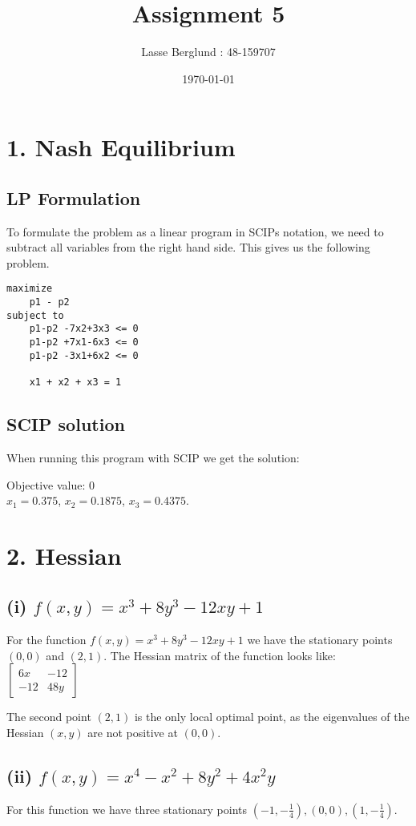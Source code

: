 \documentclass[12pt]{report}
\title{Assignment 5}
\author{Lasse Berglund : 48-159707}
\date{\today}
\begin{document}
\maketitle

\section*{1. Nash Equilibrium}
\subsection*{LP Formulation}
	To formulate the problem as a linear program in SCIPs notation, we need to subtract all variables from the right hand side. This gives us the following problem.

	\begin{verbatim}
maximize 
	p1 - p2
subject to
	p1-p2 -7x2+3x3 <= 0
	p1-p2 +7x1-6x3 <= 0
	p1-p2 -3x1+6x2 <= 0

	x1 + x2 + x3 = 1

	\end{verbatim}

\subsection*{SCIP solution}
	When running this program with SCIP we get the solution:

	Objective value: $0$\\
	$x_1 = 0.375$, $x_2 = 0.1875$, $x_3 = 0.4375$.

\section*{2. Hessian}
\subsection*{(i) $f(x,y)= x^3 + 8y^3 -12xy +1$}
For the function $f(x,y)= x^3 + 8y^3 -12xy +1$ we have the stationary points $(0,0)$ and $(2,1)$. The Hessian matrix of the function looks like:
$
\begin{bmatrix}
	6x & -12 \\
	-12 & 48y
\end{bmatrix}
$

The second point $(2,1)$ is the only local optimal point, as the eigenvalues of the Hessian $(x,y)$ are not positive at $(0,0)$.


\subsection*{(ii) $f(x,y) = x^4 -x^2 + 8y^2 +4x^2y $}
For this function we have three stationary points $(-1,-\frac{1}{4}), (0,0), (1,-\frac{1}{4})$.
\end{document}
